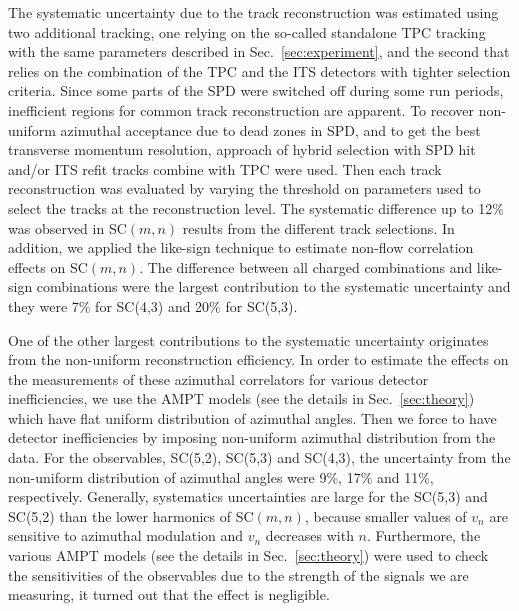 The systematic uncertainty due to the track reconstruction was estimated using two additional tracking, one relying on the so-called standalone TPC tracking with the 
same parameters described in Sec.~\ref{sec:experiment}, and the second that relies on the combination of the TPC and the ITS detectors with tighter selection criteria.
Since some parts of the SPD were switched off during some run periods, inefficient regions for common track reconstruction are apparent. To recover non-uniform azimuthal acceptance due to dead zones in SPD, and to get the best transverse momentum resolution, approach of hybrid selection with SPD hit and/or ITS refit tracks combine with TPC were used.  Then each track reconstruction was evaluated by varying the threshold on parameters used to select the tracks at the reconstruction level. 
The systematic difference up to 12\% was observed in SC$(m,n)$ results from the different track selections. 
In addition, we applied the like-sign technique to estimate non-flow correlation effects on SC$(m,n)$. The difference between all charged combinations and like-sign combinations were the largest contribution to the systematic uncertainty and they were  7\% for SC(4,3) and 20\% for SC(5,3). 

One of the other largest contributions to the systematic uncertainty originates from the non-uniform reconstruction efficiency. In order to estimate the effects on the measurements of these azimuthal correlators for various detector inefficiencies, we use the AMPT models (see the details in Sec.~\ref{sec:theory}) which have flat uniform distribution of azimuthal angles. Then we force to have detector inefficiencies by imposing non-uniform azimuthal distribution from the data. For the observables, SC(5,2), SC(5,3) and SC(4,3), the uncertainty from the non-uniform distribution of azimuthal angles were 9\%, 17\% and 11\%, respectively.
Generally, systematics uncertainties are large for the SC(5,3) and SC(5,2) than the lower harmonics of SC$(m,n)$, because smaller values of $v_n$ are sensitive to azimuthal modulation and $v_n$ decreases with $n$. Furthermore, the various AMPT models (see the details in Sec.~\ref{sec:theory}) were used to check the sensitivities of the observables due to the strength of the signals we are measuring, it turned out that the effect is negligible.
